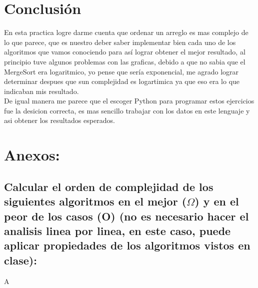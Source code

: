 \documentclass[spanish]{article}
\begin{document}
\newpage

\newpage
\section{Conclusi\'on}

	\bigskip
	En esta practica logre darme cuenta que ordenar un arreglo es mas complejo de lo que parece, que es nuestro deber saber implementar bien cada uno de los algoritmos que vamos conociendo
	para así lograr obtener el mejor resultado, al principio tuve algunos problemas con las graficas, debido a que no sabia que el MergeSort era logaritmico, yo pense que sería exponencial, 
	me agrado lograr determinar despues que sun complejidad es logartimica ya que eso era lo que indicaban mis resultado.\\
	De igual manera me parece que el escoger Python para programar estos ejercicios fue la desicion correcta, es mas sencillo trabajar con los datos en este lenguaje y asi obtener los resultados esperados.
	\bigskip


	\section{Anexos:}
	
	\subsection{Calcular el orden de complejidad de los siguientes algoritmos en el mejor ($\Omega$) y en el peor de los casos (O) (no es necesario hacer el analisis linea por linea, en este 		caso, puede aplicar propiedades de los algoritmos vistos en clase):}

	{\large{A}}\\
\end{document}
